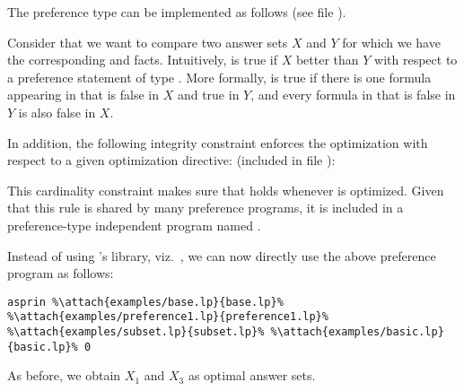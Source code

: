 \begin{example}\label{asprin:subset_imp}
The preference type  can be implemented as follows
(see file ).
%

%
Consider that we want to compare two answer sets $X$ and $Y$
for which we have the corresponding  and  facts. 
Intuitively,  is true if $X$ better than $Y$ with respect to a preference statement  
of type . 
More formally, 
 is true if there is one formula  appearing in  that is false in $X$ and true in $Y$, 
and every formula  in  that is false in $Y$ is also false in $X$.  

In addition, 
the following integrity constraint enforces the optimization with respect to a given optimization directive:
(included in file ):
%

%
This cardinality constraint makes sure that  holds whenever  is optimized. 
Given that this rule is shared by many preference programs, 
it is included in a preference-type independent program named .

Instead of using \asprin's library, viz.~, 
we can now directly use the above preference program as follows:
\begin{lstlisting}[numbers=none,escapechar=\%]
asprin %\attach{examples/base.lp}{base.lp}% %\attach{examples/preference1.lp}{preference1.lp}% %\attach{examples/subset.lp}{subset.lp}% %\attach{examples/basic.lp}{basic.lp}% 0
\end{lstlisting}
As before, we obtain $X_1$ and $X_3$ as optimal answer sets.
\end{example}

